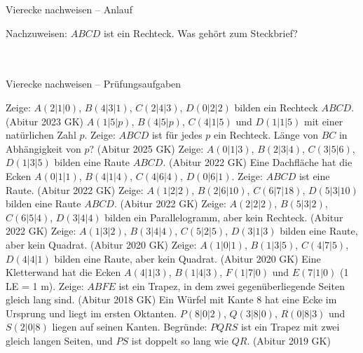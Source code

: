 \begin{aufgabe}{Vierecke nachweisen – Anlauf}
\begin{teile}
\teil Nachzuweisen: $ABCD$ ist ein Rechteck. Was gehört zum Steckbrief? \\  \\  \\ 
\end{teile}
\end{aufgabe}

\begin{aufgabe}{Vierecke nachweisen – Prüfungsaufgaben}
\begin{teile}
\teil Zeige: $A(2 | 1 | 0)$, $B(4 | 3 | 1)$, $C(2 | 4 | 3)$, $D(0 | 2 | 2)$ bilden ein Rechteck $ABCD$. \hfill (Abitur 2023 GK)
\teil $A(1 | 5 | p)$, $B(4 | 5 | p)$, $C(4 | 1 | 5)$ und $D(1 | 1 | 5)$ mit einer natürlichen Zahl $p$. Zeige: $ABCD$ ist für jedes $p$ ein Rechteck. Länge von $BC$ in Abhängigkeit von $p$? \hfill (Abitur 2025 GK)
\teil Zeige: $A(0 | 1 | 3)$, $B(2 | 3 | 4)$, $C(3 | 5 | 6)$, $D(1 | 3 | 5)$ bilden eine Raute $ABCD$. \hfill (Abitur 2022 GK)
\teil Eine Dachfläche hat die Ecken $A(0 | 1 | 1)$, $B(4 | 1 | 4)$, $C(4 | 6 | 4)$, $D(0 | 6 | 1)$. Zeige: $ABCD$ ist eine Raute. \hfill (Abitur 2022 GK)
\teil Zeige: $A(1 | 2 | 2)$, $B(2 | 6 | 10)$, $C(6 | 7 | 18)$, $D(5 | 3 | 10)$ bilden eine Raute $ABCD$. \hfill (Abitur 2022 GK)
\teil Zeige: $A(2 | 2 | 2)$, $B(5 | 3 | 2)$, $C(6 | 5 | 4)$, $D(3 | 4 | 4)$ bilden ein Parallelogramm, aber kein Rechteck. \hfill (Abitur 2022 GK)
\teil Zeige: $A(1 | 3 | 2)$, $B(3 | 4 | 4)$, $C(5 | 2 | 5)$, $D(3 | 1 | 3)$ bilden eine Raute, aber kein Quadrat. \hfill (Abitur 2020 GK)
\teil Zeige: $A(1 | 0 | 1)$, $B(1 | 3 | 5)$, $C(4 | 7 | 5)$, $D(4 | 4 | 1)$ bilden eine Raute, aber kein Quadrat. \hfill (Abitur 2020 GK)
\teil Eine Kletterwand hat die Ecken $A(4 | 1 | 3)$, $B(1 | 4 | 3)$, $F(1 | 7 | 0)$ und $E(7 | 1 | 0)$ (1 LE = 1 m). Zeige: $ABFE$ ist ein Trapez, in dem zwei gegenüberliegende Seiten gleich lang sind. \hfill (Abitur 2018 GK)
\teil Ein Würfel mit Kante $8$ hat eine Ecke im Ursprung und liegt im ersten Oktanten. $P(8 | 0 | 2)$, $Q(3 | 8 | 0)$, $R(0 | 8 | 3)$ und $S(2 | 0 | 8)$ liegen auf seinen Kanten. Begründe: $PQRS$ ist ein Trapez mit zwei gleich langen Seiten, und $PS$ ist doppelt so lang wie $QR$. \hfill (Abitur 2019 GK)
\end{teile}
\end{aufgabe}

